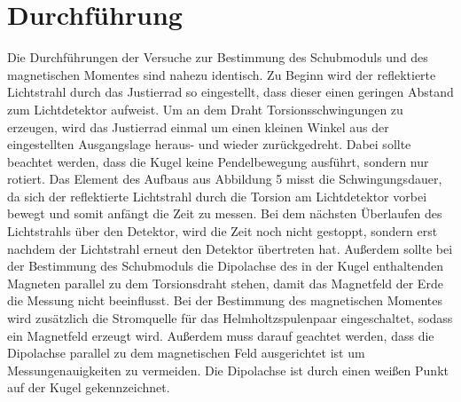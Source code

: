 \section{Durchführung}

Die Durchführungen der Versuche zur Bestimmung des Schubmoduls und des magnetischen Momentes sind nahezu identisch.
Zu Beginn wird der reflektierte Lichtstrahl durch das Justierrad so eingestellt, dass dieser einen geringen Abstand zum Lichtdetektor aufweist.
Um an dem Draht Torsionsschwingungen zu erzeugen, wird das Justierrad einmal um einen kleinen Winkel aus der eingestellten Ausgangslage heraus- und wieder zurückgedreht.
Dabei sollte beachtet werden, dass die Kugel keine Pendelbewegung ausführt, sondern nur rotiert.
Das Element des Aufbaus aus Abbildung 5 misst die Schwingungsdauer, da sich der reflektierte Lichtstrahl durch die Torsion am Lichtdetektor vorbei bewegt und somit anfängt die Zeit zu messen.
Bei dem nächsten Überlaufen des Lichtstrahls über den Detektor, wird die Zeit noch nicht gestoppt, sondern erst nachdem der Lichtstrahl erneut den Detektor übertreten hat.
Außerdem sollte bei der Bestimmung des Schubmoduls die Dipolachse des in der Kugel enthaltenden Magneten parallel zu dem Torsionsdraht stehen, damit das Magnetfeld der Erde die Messung nicht beeinflusst.
Bei der Bestimmung des magnetischen Momentes wird zusätzlich die Stromquelle für das Helmholtzspulenpaar eingeschaltet, sodass ein Magnetfeld erzeugt wird.
Außerdem muss darauf geachtet werden, dass die Dipolachse parallel zu dem magnetischen Feld ausgerichtet ist um Messungenauigkeiten zu vermeiden.
Die Dipolachse ist durch einen weißen Punkt auf der Kugel gekennzeichnet.

